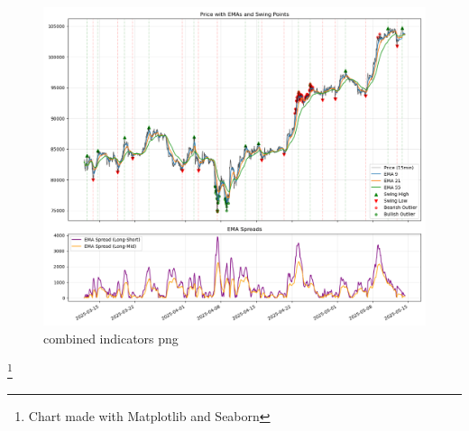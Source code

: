 \documentclass[12pt]{article}
\begin{document}
\begin{figure}[H]
    \centering
    \includegraphics[width=\textwidth]{imgs/swingpoints_emaspread_priceOutliers.png}
    \caption{combined indicators png}
\end{figure}

\footnote{Chart made with Matplotlib and Seaborn}
\end{document}

